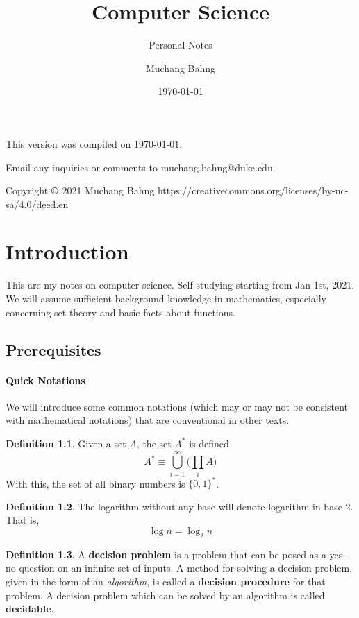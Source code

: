 \documentclass[a4paper, 12pt]{report}
\institute{Duke University}
\title{Computer Science}
\subtitle{Personal Notes}
\author{Muchang Bahng}
\date{\today}
\theoremstyle{remark}
\theoremstyle{definition}
\newtheorem{definition}{Definition}[section]
\begin{document}
\maketitle
\vspace*{\fill}
\vfill
This version was compiled on \today. 

Email any inquiries or comments to muchang.bahng@duke.edu. 

Copyright $\copyright$  2021 Muchang Bahng
\doclicenseThis
https://creativecommons.org/licenses/by-nc-sa/4.0/deed.en
\romantableofcontents

\chapter{Introduction}

This are my notes on computer science. Self studying starting from Jan 1st, 2021. We will assume sufficient background knowledge in mathematics, especially concerning set theory and basic facts about functions. 

\section{Prerequisites}

\subsubsection{Quick Notations}
We will introduce some common notations (which may or may not be consistent with mathematical notations) that are conventional in other texts. 

\begin{definition}
Given a set $A$, the set $A^*$ is defined 
\[A^* \equiv \bigcup_{i=1}^\infty \bigg(\prod_i A\bigg) \]
With this, the set of all binary numbers is $\{0,1\}^*$. 
\end{definition}

\begin{definition}
The logarithm without any base will denote logarithm in base 2. That is, 
\[\log n = \log_2 n\]
\end{definition}

\begin{definition}
A \textbf{decision problem} is a problem that can be posed as a yes-no question on an infinite set of inputs. A method for solving a decision problem, given in the form of an \textit{algorithm}, is called a \textbf{decision procedure} for that problem. A decision problem which can be solved by an algorithm is called \textbf{decidable}. 
\end{definition}
\end{document}
